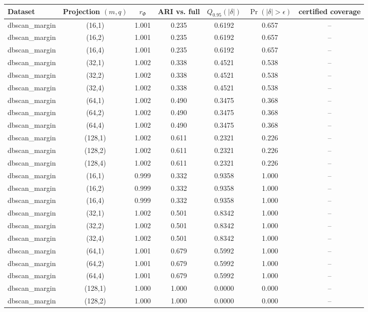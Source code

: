\begin{tabular}{lcccccc}
\toprule
Dataset & Projection $(m,q)$ & $r_\Phi$ & ARI vs. full & $Q_{0.95}(|\delta|)$ & $\Pr(|\delta|>\epsilon)$ & certified coverage \\
\midrule
dbscan\_margin & (16,1) & 1.001 & 0.235 & 0.6192 & 0.657 & -- \\
dbscan\_margin & (16,2) & 1.001 & 0.235 & 0.6192 & 0.657 & -- \\
dbscan\_margin & (16,4) & 1.001 & 0.235 & 0.6192 & 0.657 & -- \\
dbscan\_margin & (32,1) & 1.002 & 0.338 & 0.4521 & 0.538 & -- \\
dbscan\_margin & (32,2) & 1.002 & 0.338 & 0.4521 & 0.538 & -- \\
dbscan\_margin & (32,4) & 1.002 & 0.338 & 0.4521 & 0.538 & -- \\
dbscan\_margin & (64,1) & 1.002 & 0.490 & 0.3475 & 0.368 & -- \\
dbscan\_margin & (64,2) & 1.002 & 0.490 & 0.3475 & 0.368 & -- \\
dbscan\_margin & (64,4) & 1.002 & 0.490 & 0.3475 & 0.368 & -- \\
dbscan\_margin & (128,1) & 1.002 & 0.611 & 0.2321 & 0.226 & -- \\
dbscan\_margin & (128,2) & 1.002 & 0.611 & 0.2321 & 0.226 & -- \\
dbscan\_margin & (128,4) & 1.002 & 0.611 & 0.2321 & 0.226 & -- \\
dbscan\_margin & (16,1) & 0.999 & 0.332 & 0.9358 & 1.000 & -- \\
dbscan\_margin & (16,2) & 0.999 & 0.332 & 0.9358 & 1.000 & -- \\
dbscan\_margin & (16,4) & 0.999 & 0.332 & 0.9358 & 1.000 & -- \\
dbscan\_margin & (32,1) & 1.002 & 0.501 & 0.8342 & 1.000 & -- \\
dbscan\_margin & (32,2) & 1.002 & 0.501 & 0.8342 & 1.000 & -- \\
dbscan\_margin & (32,4) & 1.002 & 0.501 & 0.8342 & 1.000 & -- \\
dbscan\_margin & (64,1) & 1.001 & 0.679 & 0.5992 & 1.000 & -- \\
dbscan\_margin & (64,2) & 1.001 & 0.679 & 0.5992 & 1.000 & -- \\
dbscan\_margin & (64,4) & 1.001 & 0.679 & 0.5992 & 1.000 & -- \\
dbscan\_margin & (128,1) & 1.000 & 1.000 & 0.0000 & 0.000 & -- \\
dbscan\_margin & (128,2) & 1.000 & 1.000 & 0.0000 & 0.000 & -- \\

\end{tabular}
